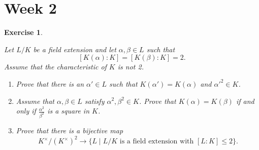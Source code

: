 \documentclass[a4paper,10pt,reqno]{amsart}
\newtheorem{ex}{Exercise}[section]
\begin{document}
\section{Week 2}

\begin{ex}
\label{2.1}

    Let $L/K$ be a field extension and let $\alpha, \beta\in L$ such that 
    \[
    [K(\alpha):K]=[K(\beta):K]=2.
    \]
    Assume that the characteristic of $K$ is not 2.
    \begin{enumerate}[label=(\roman*)]
    \item Prove that there is an $\alpha' \in L$ such that $K(\alpha') = K(\alpha)$ and $\alpha'^2 \in K$.
    \item Assume that $\alpha,\beta \in L$ satisfy $\alpha^2,\beta^2 \in K$. Prove that $K(\alpha)=K(\beta)$ if and only if $\frac{\alpha^2}{\beta^2}$ is a square in $K$.
    \item Prove that there is a bijective map 
    \[
    K^\times/(K^\times)^2\longrightarrow \{L\mid L/K \text{ is a field extension with } [L:K] \leq 2\}.
    \]
\end{enumerate}    
\end{ex}
\end{document}
